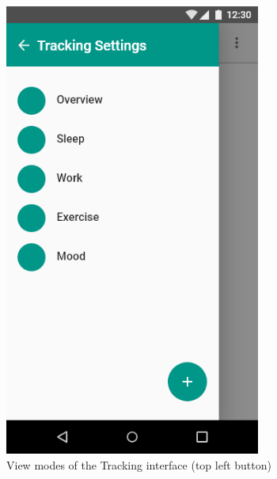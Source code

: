 \documentclass[a4paper,11pt]{article} %
\begin{document}
\begin{figure}[h!]
  \centering
  \includegraphics[width=0.75\textwidth]{img/ui-wireframe/Tracking-View.png}
  \caption{View modes of the Tracking interface (top left button)}
\end{figure}
\newpage
\end{document}
